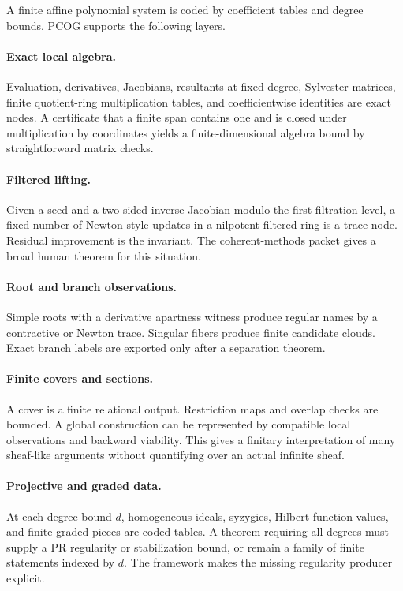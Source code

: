 A finite affine polynomial system is coded by coefficient tables and degree
bounds.  PCOG supports the following layers.

\paragraph{Exact local algebra.}
Evaluation, derivatives, Jacobians, resultants at fixed degree, Sylvester
matrices, finite quotient-ring multiplication tables, and coefficientwise
identities are exact nodes.  A certificate that a finite span contains one and
is closed under multiplication by coordinates yields a finite-dimensional
algebra bound by straightforward matrix checks.

\paragraph{Filtered lifting.}
Given a seed and a two-sided inverse Jacobian modulo the first filtration
level, a fixed number of Newton-style updates in a nilpotent filtered ring is a
trace node.  Residual improvement is the invariant.  The coherent-methods
packet gives a broad human theorem for this situation.

\paragraph{Root and branch observations.}
Simple roots with a derivative apartness witness produce regular names by a
contractive or Newton trace.  Singular fibers produce finite candidate clouds.
Exact branch labels are exported only after a separation theorem.

\paragraph{Finite covers and sections.}
A cover is a finite relational output.  Restriction maps and overlap checks
are bounded.  A global construction can be represented by compatible local
observations and backward viability.  This gives a finitary interpretation of
many sheaf-like arguments without quantifying over an actual infinite sheaf.

\paragraph{Projective and graded data.}
At each degree bound \(d\), homogeneous ideals, syzygies, Hilbert-function
values, and finite graded pieces are coded tables.  A theorem requiring all
degrees must supply a PR regularity or stabilization bound, or remain a family
of finite statements indexed by \(d\).  The framework makes the missing
regularity producer explicit.

